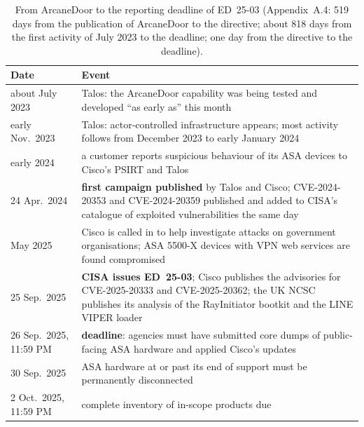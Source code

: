 \documentclass[11pt,a4paper]{article}
\begin{document}
\begin{table}[H]
\centering\small
\begin{tabular}{@{}lP{12.6cm}@{}}
\toprule
Date & Event \\
\midrule
about July 2023 & Talos: the ArcaneDoor capability was being tested and developed ``as early as'' this month \cite{talos} \\
early Nov.\ 2023 & Talos: actor-controlled infrastructure appears; most activity follows from December 2023 to early January 2024 \cite{talos} \\
early 2024 & a customer reports suspicious behaviour of its ASA devices to Cisco's PSIRT and Talos \cite{talos} \\
24 Apr.\ 2024 & \textbf{first campaign published} by Talos and Cisco; CVE-2024-20353 and CVE-2024-20359 published and added to CISA's catalogue of
exploited vulnerabilities the same day \cite{talos,nvd} \\
May 2025 & Cisco is called in to help investigate attacks on government organisations; ASA 5500-X devices with VPN web services are found compromised
\cite{secweek} \\
25 Sep.\ 2025 & \textbf{CISA issues ED~25-03}; Cisco publishes the advisories for CVE-2025-20333 and CVE-2025-20362; the UK NCSC publishes its analysis of
the RayInitiator bootkit and the LINE VIPER loader \cite{ed2503,ciscoadv,ncscmar} \\
26 Sep.\ 2025, 11:59 PM & \textbf{deadline}: agencies must have submitted core dumps of public-facing ASA hardware and applied Cisco's updates \cite{ed2503} \\
30 Sep.\ 2025 & ASA hardware at or past its end of support must be permanently disconnected \cite{ed2503} \\
2 Oct.\ 2025, 11:59 PM & complete inventory of in-scope products due \cite{ed2503} \\
\bottomrule
\end{tabular}
\caption{From ArcaneDoor to the reporting deadline of ED~25-03 (Appendix~A.4: 519 days from the publication of ArcaneDoor to the directive; about 818 days
from the first activity of July 2023 to the deadline; one day from the directive to the deadline).}\label{tab:q4time}
\end{table}
\end{document}

